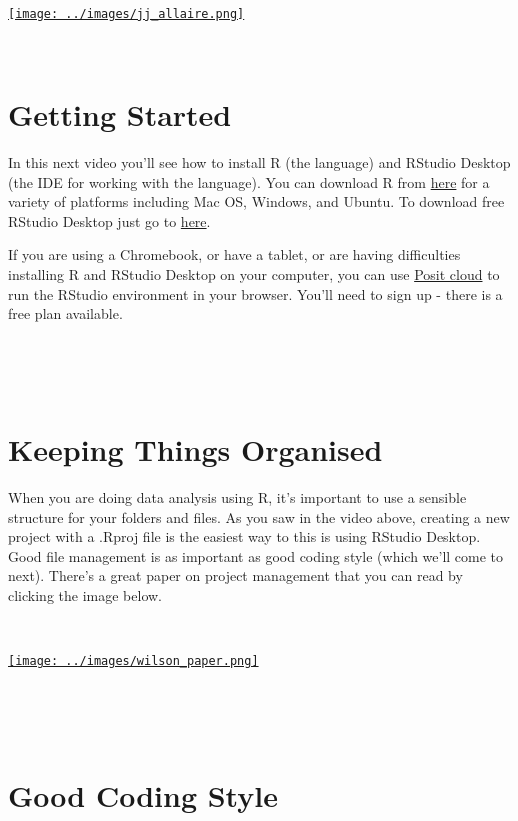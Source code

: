 \documentclass[
]{book}
\begin{document}
~~

\href{https://rstudio.com/resources/rstudioconf-2020/open-source-software-for-data-science/}{\texttt{[image: ../images/jj\_allaire.png]}}

~~

\hypertarget{getting-started}{%
\section{Getting Started}\label{getting-started}}

In this next video you'll see how to install R (the language) and RStudio Desktop (the IDE for working with the language). You can download R from \href{https://www.r-project.org}{here} for a variety of platforms including Mac OS, Windows, and Ubuntu. To download free RStudio Desktop just go to \href{https://posit.co}{here}.

If you are using a Chromebook, or have a tablet, or are having difficulties installing R and RStudio Desktop on your computer, you can use \href{https://posit.cloud/plans/free}{Posit cloud} to run the RStudio environment in your browser. You'll need to sign up - there is a free plan available.

~~

~~

\hypertarget{keeping-things-organised}{%
\section{Keeping Things Organised}\label{keeping-things-organised}}

When you are doing data analysis using R, it's important to use a sensible structure for your folders and files. As you saw in the video above, creating a new project with a .Rproj file is the easiest way to this is using RStudio Desktop. Good file management is as important as good coding style (which we'll come to next). There's a great paper on project management that you can read by clicking the image below.

~~

\href{https://journals.plos.org/ploscompbiol/article/file?id=10.1371/journal.pcbi.1005510\&type=printable}{\texttt{[image: ../images/wilson\_paper.png]}}

~~

~~

\hypertarget{good-coding-style}{%
\section{Good Coding Style}\label{good-coding-style}}
\end{document}

